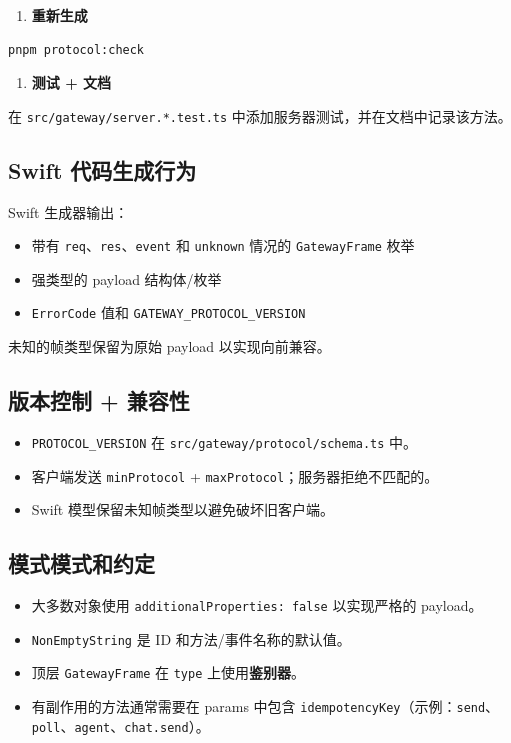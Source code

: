 \begin{enumerate}
  \item \textbf{重新生成}
\end{enumerate}


\begin{lstlisting}[language=bash]
pnpm protocol:check
\end{lstlisting}


\begin{enumerate}
  \item \textbf{测试 + 文档}
\end{enumerate}


在 \texttt{src/gateway/server.*.test.ts} 中添加服务器测试，并在文档中记录该方法。

\subsection{Swift 代码生成行为}


Swift 生成器输出：

\begin{itemize}
  \item 带有 \texttt{req}、\texttt{res}、\texttt{event} 和 \texttt{unknown} 情况的 \texttt{GatewayFrame} 枚举
  \item 强类型的 payload 结构体/枚举
  \item \texttt{ErrorCode} 值和 \texttt{GATEWAY\_PROTOCOL\_VERSION}
\end{itemize}


未知的帧类型保留为原始 payload 以实现向前兼容。

\subsection{版本控制 + 兼容性}


\begin{itemize}
  \item \texttt{PROTOCOL\_VERSION} 在 \texttt{src/gateway/protocol/schema.ts} 中。
  \item 客户端发送 \texttt{minProtocol} + \texttt{maxProtocol}；服务器拒绝不匹配的。
  \item Swift 模型保留未知帧类型以避免破坏旧客户端。
\end{itemize}


\subsection{模式模式和约定}


\begin{itemize}
  \item 大多数对象使用 \texttt{additionalProperties: false} 以实现严格的 payload。
  \item \texttt{NonEmptyString} 是 ID 和方法/事件名称的默认值。
  \item 顶层 \texttt{GatewayFrame} 在 \texttt{type} 上使用\textbf{鉴别器}。
  \item 有副作用的方法通常需要在 params 中包含 \texttt{idempotencyKey}（示例：\texttt{send}、\texttt{poll}、\texttt{agent}、\texttt{chat.send}）。
\end{itemize}


